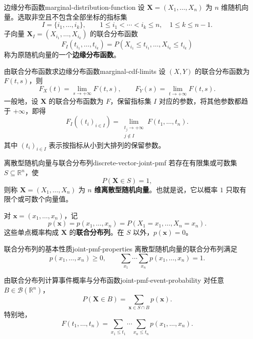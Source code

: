 \begin{mydefinition}{边缘分布函数}{marginal-distribution-function}
设 $\boldsymbol X=(X_1,\ldots,X_n)$ 为 $n$ 维随机向量。选取非空且不包含全部坐标的指标集
\[
I=\{i_1,\ldots,i_k\},\qquad
1\leq i_1<\cdots<i_k\leq n,\quad 1\leq k\leq n-1.
\]
子向量 $\boldsymbol X_I=(X_{i_1},\ldots,X_{i_k})$ 的联合分布函数
\[
F_I(t_{i_1},\ldots,t_{i_k})
=P(X_{i_1}\leq t_{i_1},\ldots,X_{i_k}\leq t_{i_k})
\]
称为原随机向量的一个\textbf{边缘分布函数}。
\end{mydefinition}

\begin{proposition}{由联合分布函数求边缘分布函数}{marginal-cdf-limits}
设 $(X,Y)$ 的联合分布函数为 $F(t,s)$，则
\[
F_X(t)=\lim_{s\to+\infty}F(t,s),\qquad
F_Y(s)=\lim_{t\to+\infty}F(t,s).
\]
一般地，设 $\boldsymbol X$ 的联合分布函数为 $F$，保留指标集 $I$ 对应的参数，将其他参数都趋于 $+\infty$，即得
\[
F_I((t_i)_{i\in I})
=\lim_{\substack{t_j\to+\infty\\j\notin I}}F(t_1,\ldots,t_n).
\]
其中 $(t_i)_{i\in I}$ 表示按指标从小到大排列的保留参数。
\end{proposition}

\begin{mydefinition}{离散型随机向量与联合分布列}{discrete-vector-joint-pmf}
若存在有限集或可数集 $S\subseteq\mathbb R^n$，使
\[
P(\boldsymbol X\in S)=1,
\]
则称 $\boldsymbol X=(X_1,\ldots,X_n)$ 为 \textbf{$n$ 维离散型随机向量}。也就是说，它以概率 $1$ 只取有限个或可数个向量值。

对 $\boldsymbol x=(x_1,\ldots,x_n)$，记
\[
p(\boldsymbol x)=p(x_1,\ldots,x_n)
=P(X_1=x_1,\ldots,X_n=x_n).
\]
这些单点概率构成 $\boldsymbol X$ 的\textbf{联合分布列}。在 $S$ 以外，$p(\boldsymbol x)=0$。
\end{mydefinition}

\begin{proposition}{联合分布列的基本性质}{joint-pmf-properties}
离散型随机向量的联合分布列满足
\[
p(x_1,\ldots,x_n)\geq0,\qquad
\sum_{x_1}\cdots\sum_{x_n}p(x_1,\ldots,x_n)=1.
\]
\end{proposition}

\begin{proposition}{由联合分布列计算事件概率与分布函数}{joint-pmf-event-probability}
对任意 $B\in\mathcal B(\mathbb R^n)$，
\[
P(\boldsymbol X\in B)
=\sum_{\boldsymbol x\in S\cap B}p(\boldsymbol x).
\]
特别地，
\[
F(t_1,\ldots,t_n)
=\sum_{x_1\leq t_1}\cdots\sum_{x_n\leq t_n}
p(x_1,\ldots,x_n).
\]
\end{proposition}

